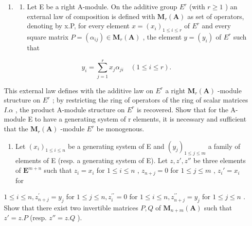 \BourbakiExercisesSection

\begin{enumerate}
\def\labelenumi{\arabic{enumi}.}
\tightlist
\item
  \begin{enumerate}
  \def\labelenumii{(\alph{enumii})}
  \tightlist
  \item
    Let E be a right A-module. On the additive group \(E^{r}\) (with \(r \geqslant 1\) ) an external law of composition is defined with \(\mathbf{M}_{r}(\mathbf{A})\) as set of operators, denoting by x.P, for every element \(x = (x_{i})_{1 \leqslant i \leqslant r}\) of \(E^{r}\) and every square matrix \(P = (\alpha_{ij}) \in \mathbf{M}_{r}(\mathbf{A})\) , the element \(y = (y_{i})\) of \(E^{r}\) such that
  \end{enumerate}
\end{enumerate}

\[
y _ {i} = \sum_ {j = 1} ^ {r} x _ {j} \alpha_ {j i} \quad (1 \leqslant i \leqslant r).
\]

This external law defines with the additive law on \(E^{r}\) a right \(\mathbf{M}_{r}(\mathbf{A})\) -module structure on \(E^{r}\) ; by restricting the ring of operators of the ring of scalar matrices \(I.\alpha\) , the product A-module structure on \(E^{r}\) is recovered. Show that for the A-module E to have a generating system of r elements, it is necessary and sufficient that the \(\mathbf{M}_{r}(\mathbf{A})\) -module \(E^{r}\) be monogenous.

\begin{enumerate}
\def\labelenumi{(\alph{enumi})}
\setcounter{enumi}{1}
\tightlist
\item
  Let \((x_{i})_{1\leqslant i\leqslant n}\) be a generating system of E and \((y_{j})_{1\leqslant j\leqslant m}\) a family of elements of E (resp. a generating system of E). Let \(z, z', z''\) be three elements of \(\mathbf{E}^{m + n}\) such that \(z_{i} = x_{i}\) for \(1\leqslant i\leqslant n\) , \(z_{n + j} = 0\) for \(1\leqslant j\leqslant m\) , \(z_{i}' = x_{i}\) for
\end{enumerate}

\(1 \leqslant i \leqslant n, z_{n+j}^{\prime} = y_{j}\) for \(1 \leqslant j \leqslant n, z_{i}^{\prime \prime} = 0\) for \(1 \leqslant i \leqslant n, z_{n+j}^{\prime \prime} = y_{j}\) for \(1 \leqslant j \leqslant n\) . Show that there exist two invertible matrices \(P, Q\) of \(\mathbf{M}_{n+m}(\mathbf{A})\) such that \(z' = z.P\) (resp. \(z'' = z.Q\) ).

